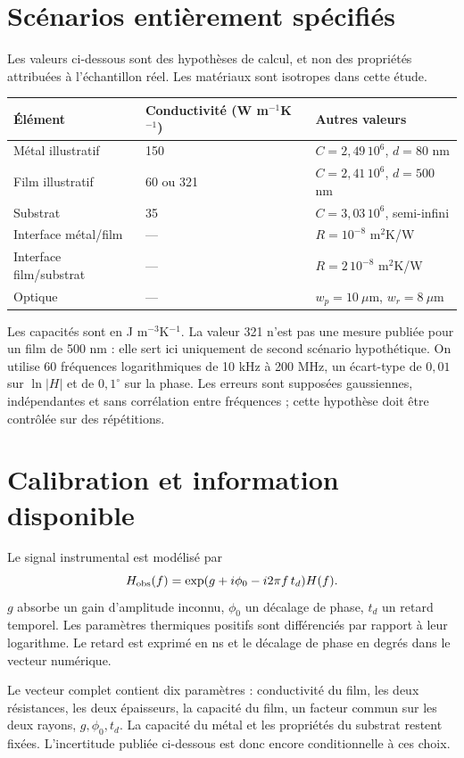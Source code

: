 \documentclass[11pt,a4paper]{article}
\begin{document}
\section{Scénarios entièrement spécifiés}
Les valeurs ci-dessous sont des hypothèses de calcul, et non des propriétés
attribuées à l'échantillon réel. Les matériaux sont isotropes dans cette étude.
\begin{center}
\begin{tabular}{@{}lll@{}}
\toprule
Élément & Conductivité (W m$^{-1}$K$^{-1}$) & Autres valeurs\\
\midrule
Métal illustratif & 150 & $C=2{,}49\,10^6$, $d=80$ nm\\
Film illustratif & 60 ou 321 & $C=2{,}41\,10^6$, $d=500$ nm\\
Substrat & 35 & $C=3{,}03\,10^6$, semi-infini\\
Interface métal/film & --- & $R=10^{-8}$ m$^2$K/W\\
Interface film/substrat & --- & $R=2\,10^{-8}$ m$^2$K/W\\
Optique & --- & $w_p=10~\mu$m, $w_r=8~\mu$m\\
\bottomrule
\end{tabular}
\end{center}
Les capacités sont en J m$^{-3}$K$^{-1}$.
La valeur 321 n'est pas une mesure publiée pour un film de 500 nm :
elle sert ici uniquement de second scénario hypothétique.
On utilise 60 fréquences logarithmiques de 10 kHz à 200 MHz,
un écart-type de $0{,}01$ sur $\ln|H|$ et de $0{,}1^\circ$ sur la phase.
Les erreurs sont supposées gaussiennes, indépendantes et sans corrélation
entre fréquences ; cette hypothèse doit être contrôlée sur des répétitions.

\section{Calibration et information disponible}
Le signal instrumental est modélisé par
\[
 H_{\rm obs}(f)=\exp(g+i\phi_0-i2\pi f\,t_d)H(f).
\]
$g$ absorbe un gain d'amplitude inconnu, $\phi_0$ un décalage de phase,
$t_d$ un retard temporel. Les paramètres thermiques positifs sont
différenciés par rapport à leur logarithme. Le retard est exprimé en ns
et le décalage de phase en degrés dans le vecteur numérique.

Le vecteur complet contient dix paramètres : conductivité du film,
les deux résistances, les deux épaisseurs, la capacité du film,
un facteur commun sur les deux rayons, $g,\phi_0,t_d$.
La capacité du métal et les propriétés du substrat restent fixées.
L'incertitude publiée ci-dessous est donc encore conditionnelle à ces choix.
\end{document}
